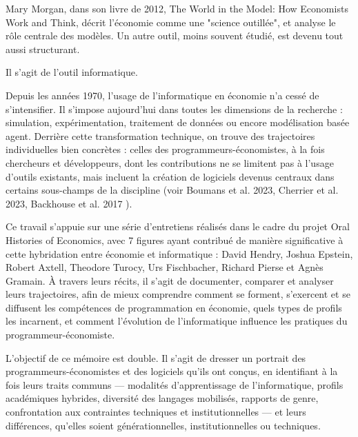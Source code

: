 
Mary Morgan, dans son livre de 2012, The World in the Model: How Economists Work and Think\cite{morganWorldModel}, décrit l'économie comme une "science outillée", et analyse le rôle centrale des modèles. Un autre outil, moins souvent étudié, est devenu tout aussi structurant.

Il s'agit de l'outil informatique.

Depuis les années 1970, l’usage de l’informatique en économie n’a cessé de s'intensifier. Il s’impose aujourd’hui dans toutes les dimensions de la recherche : simulation, expérimentation, traitement de données ou encore modélisation basée agent. Derrière cette transformation technique, on trouve des trajectoires individuelles bien concrètes : celles des programmeurs-économistes, à la fois chercheurs et développeurs, dont les contributions ne se limitent pas à l’usage d’outils existants, mais incluent la création de logiciels devenus centraux dans certains sous-champs de la discipline (voir Boumans et al. 2023\cite{boumansComputerizationEconomicsThree2023}, Cherrier et al. 2023\cite{cherrierWriteYourModel2023}, Backhouse et al. 2017 \cite{backhouseItsComputersStupid2017}). 

Ce travail s’appuie sur une série d’entretiens réalisés dans le cadre du projet Oral Histories of Economics, avec 7 figures ayant contribué de manière significative à cette hybridation entre économie et informatique : David Hendry\cite{hendryInterviewDavidHendry2024}, Joshua Epstein\cite{epsteinInterviewJoshuaEpstein2024}, Robert Axtell\cite{axtellInterviewRobertAxtell2025}, Theodore Turocy\cite{turocyInterviewTheodoreTurocy2024}, Urs Fischbacher\cite{fischbacherInterviewUrsFischbacher2024}, Richard Pierse\cite{pierseInterviewRichardPierse2024} et Agnès Gramain\cite{gramainInterviewAgnesGramain2024}. À travers leurs récits, il s’agit de documenter, comparer et analyser leurs trajectoires, afin de mieux comprendre comment se forment, s’exercent et se diffusent les compétences de programmation en économie, quels types de profils les incarnent, et comment l'évolution de l'informatique influence les pratiques du programmeur-économiste. 

L’objectif de ce mémoire est double. Il s’agit de dresser un portrait des programmeurs-économistes et des logiciels qu’ils ont conçus, en identifiant à la fois leurs traits communs — modalités d’apprentissage de l’informatique, profils académiques hybrides, diversité des langages mobilisés, rapports de genre, confrontation aux contraintes techniques et institutionnelles — et leurs différences, qu’elles soient générationnelles, institutionnelles ou techniques.


